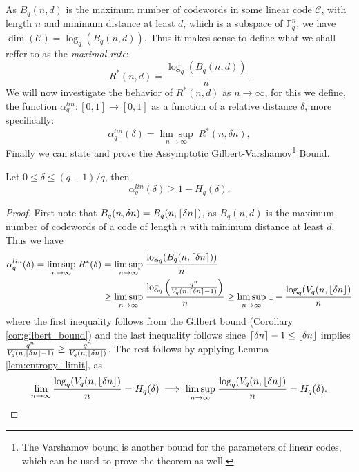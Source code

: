 As $B_q(n, d)$ is the maximum number of codewords in some linear code $\mathcal{C}$, with length $n$ and minimum distance at least $d$, which is a subspace of $\mathbb{F}_q^{n}$, we have $\dim(\mathcal{C}) = \log_q(B_q(n, d))$. Thus it makes sense to define what we shall reffer to as the \textit{maximal rate}:
\begin{equation*}
  R^{*}(n, d) = \frac{\log_{q}(B_{q}(n, d))}{n}.
\end{equation*}
We will now investigate the behavior of $R^{*}(n, d)$ as $n \to \infty$, for this we define, the function $\alpha_q^{lin}: [0, 1] \to [0, 1]$ as a function of a relative distance $\delta$, more specifically:
\begin{equation*}
  \alpha_q^{lin}(\delta) = \underset{n \to \infty}{\lim \sup} \;R^{*}(n, \delta n),
\end{equation*}
Finally we can state and prove the Assymptotic Gilbert-Varshamov\footnote{The Varshamov bound is another bound for the parameters of linear codes, which can be used to prove the theorem as well.} Bound.
\begin{theorem}
  Let $0 \leq \delta \leq (q - 1)/q$, then
  \begin{equation*}
  \alpha_q^{lin}(\delta) \geq 1 - H_q(\delta).
  \end{equation*}
\end{theorem}
\begin{proof}
  First note that $B_q(n, \delta n) = B_q(n, \lceil\delta n\rceil)$, as $B_{q}(n, d)$ is the maximum number of codewords of a code of length $n$ with minimum distance at least $d$.
  Thus we have
  \begin{align*}
\alpha_q^{lin}(\delta) = \underset{n \to \infty}{\lim \sup} \; R^{*}(\delta) &= \underset{n \to \infty}{\lim \sup} \; \frac{\log_q(B_q(n, \lceil\delta n\rceil))}{n} \\&\geq \underset{n \to \infty}{\lim \sup} \; \frac{\log_{q}\left(\frac{q^{n}}{V_{q}(n, \lceil\delta n\rceil - 1)}\right)}{n} \geq \underset{n \to \infty}{\lim \sup} \; 1 - \frac{\log_{q}({V_{q}(n, \lfloor\delta n\rfloor)}}{n}
  \end{align*}
  where the first inequality follows from the Gilbert bound (Corollary \ref{cor:gilbert_bound}) and the last inequality follows since $\lceil\delta n\rceil - 1 \leq \lfloor\delta n\rfloor$ implies $\frac{q^{n}}{V_{q}(n, \lceil\delta n\rceil - 1)} \geq \frac{q^{n}}{V_{q}(n, \lfloor\delta n\rfloor)}$. The rest follows by applying Lemma \ref{lem:entropy_limit}, as
  \begin{equation*}
  \lim_{n \to \infty}\frac{\log_{q}({V_{q}(n, \lfloor\delta n\rfloor)}}{n} = H_q(\delta) \implies \underset{n \to \infty}{\lim \sup} \;\frac{\log_{q}({V_{q}(n, \lfloor\delta n\rfloor)}}{n} = H_q(\delta). \qedhere
  \end{equation*}
\end{proof}
